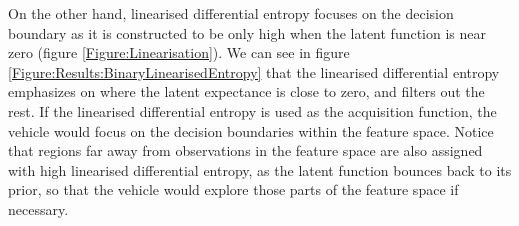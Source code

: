 \documentclass{article}
\begin{document}
		On the other hand, linearised differential entropy focuses on the decision boundary as it is constructed to be only high when the latent function is near zero (figure \ref{Figure:Linearisation}). We can see in figure \ref{Figure:Results:BinaryLinearisedEntropy} that the linearised differential entropy emphasizes on where the latent expectance is close to zero, and filters out the rest. If the linearised differential entropy is used as the acquisition function, the vehicle would focus on the decision boundaries within the feature space. Notice that regions far away from observations in the feature space are also assigned with high linearised differential entropy, as the latent function bounces back to its prior, so that the vehicle would explore those parts of the feature space if necessary.
		
		
%		
		
\end{document}

